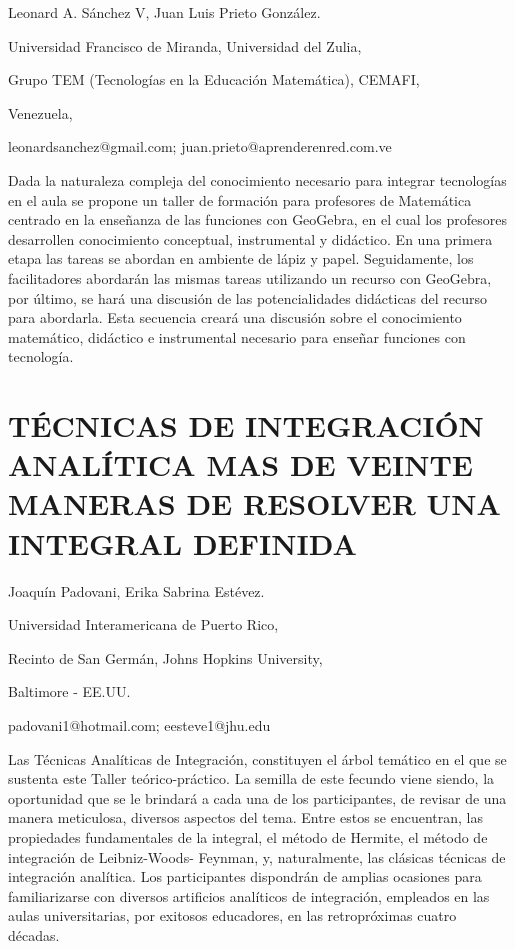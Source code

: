 \begin{datos}

Leonard A. Sánchez V, Juan Luis Prieto González.

Universidad Francisco de Miranda, Universidad del Zulia, 

Grupo TEM (Tecnologías en la Educación Matemática), CEMAFI,

Venezuela, 

leonardsanchez@gmail.com; juan.prieto@aprenderenred.com.ve

\end{datos}

Dada la naturaleza compleja del conocimiento necesario para integrar
tecnologías en el aula se propone un taller de formación para profesores
de Matemática centrado en la enseñanza de las funciones con GeoGebra,
en el cual los profesores desarrollen conocimiento conceptual, instrumental
y didáctico. En una primera etapa las tareas se abordan en ambiente
de lápiz y papel. Seguidamente, los facilitadores abordarán las mismas
tareas utilizando un recurso con GeoGebra, por último, se hará una
discusión de las potencialidades didácticas del recurso para abordarla.
Esta secuencia creará una discusión sobre el conocimiento matemático,
didáctico e instrumental necesario para enseñar funciones con tecnología. 

\setcounter{section}{10}


\section{TÉCNICAS DE INTEGRACIÓN ANALÍTICA MAS DE VEINTE MANERAS DE RESOLVER
UNA INTEGRAL DEFINIDA}

\begin{datos}

Joaquín Padovani, Erika Sabrina Estévez.

Universidad Interamericana de Puerto Rico,

Recinto de San Germán, Johns Hopkins University,

Baltimore - EE.UU. 

padovani1@hotmail.com; eesteve1@jhu.edu

\end{datos}

Las Técnicas Analíticas de Integración, constituyen el árbol temático
en el que se sustenta este Taller teórico-práctico. La semilla de
este fecundo viene siendo, la oportunidad que se le brindará a cada
una de los participantes, de revisar de una manera meticulosa, diversos
aspectos del tema. Entre estos se encuentran, las propiedades fundamentales
de la integral, el método de Hermite, el método de integración de
Leibniz-Woods- Feynman, y, naturalmente, las clásicas técnicas de
integración analítica. Los participantes dispondrán de amplias ocasiones
para familiarizarse con diversos artificios analíticos de integración,
empleados en las aulas universitarias, por exitosos educadores, en
las retropróximas cuatro décadas.


